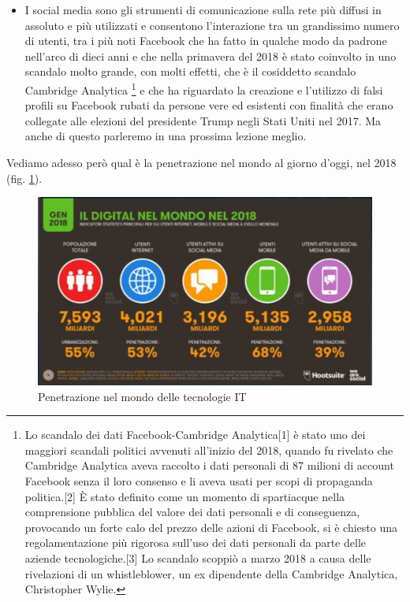 \begin{itemize}
    \item I social media sono gli strumenti di comunicazione sulla rete più diffusi in assoluto e più utilizzati e consentono l'interazione tra un grandissimo numero di utenti, tra i più noti Facebook che ha fatto in qualche modo da padrone nell'arco di dieci anni e che nella primavera del 2018 è stato coinvolto in uno scandalo molto grande, con molti effetti, che è il cosiddetto scandalo Cambridge Analytica \footnote{Lo scandalo dei dati Facebook-Cambridge Analytica[1] è stato uno dei maggiori scandali politici avvenuti all'inizio del 2018, quando fu rivelato che Cambridge Analytica aveva raccolto i dati personali di 87 milioni di account Facebook senza il loro consenso e li aveva usati per scopi di propaganda politica.[2] È stato definito come un momento di spartiacque nella comprensione pubblica del valore dei dati personali e di conseguenza, provocando un forte calo del prezzo delle azioni di Facebook, si è chiesto una regolamentazione più rigorosa sull'uso dei dati personali da parte delle aziende tecnologiche.[3]
    Lo scandalo scoppiò a marzo 2018 a causa delle rivelazioni di un whistleblower, un ex dipendente della Cambridge Analytica, Christopher Wylie.} e che ha riguardato la creazione e l'utilizzo di falsi profili su Facebook rubati da persone vere ed esistenti con finalità che erano collegate alle elezioni del presidente Trump negli Stati Uniti nel 2017. Ma anche di questo parleremo in una prossima lezione meglio.
\end{itemize}

Vediamo adesso però qual è la penetrazione nel mondo al giorno d'oggi, nel 2018 (fig. \ref{fig: penetrazione_nel_mondo}).

\begin{figure}[ht]
    \centering
    \includegraphics[width=0.9\linewidth]{images/06_lez_fig_02.jpg}
    \caption{Penetrazione nel mondo delle tecnologie IT}
    \label{fig: penetrazione_nel_mondo}
\end{figure}

